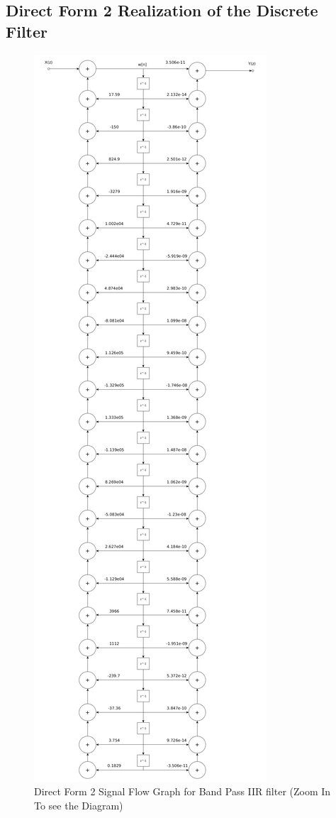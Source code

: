 \documentclass[22pt]{article}
\begin{document}
\subsection{Direct Form 2 Realization of the Discrete Filter}
\begin{figure}[H]
  \centering
  \includegraphics[scale=0.19]{images/direct_form2_bp}
  \caption{Direct Form 2 Signal Flow Graph for Band Pass IIR filter (Zoom In To see the Diagram)}
  \label{fig:7}
\end{figure}
\newpage
\end{document}
